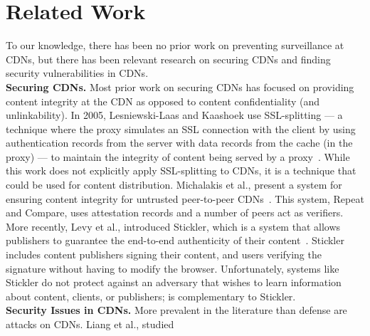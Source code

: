 \section{Related Work}
\label{sec:related}

To our knowledge, there has been no prior work on preventing surveillance at CDNs, but there 
has been relevant research on securing CDNs and finding security vulnerabilities in CDNs.\\
\vspace{0pt}
\textbf{Securing CDNs.} Most prior work on securing CDNs has focused on providing content 
integrity at the CDN as opposed to content confidentiality (and unlinkability).  In 2005, 
Lesniewski-Laas and Kaashoek use SSL-splitting --- a technique 
where the proxy simulates an SSL connection with the client by using authentication records from 
the server with data records from the cache (in the proxy) --- to maintain the 
integrity of content being served by a proxy~\cite{lesniewski2005ssl}.  While this work does not 
explicitly apply SSL-splitting to CDNs, it is a technique that could be used for content 
distribution.  Michalakis et al., present a system for ensuring content integrity for untrusted 
peer-to-peer CDNs~\cite{michalakis2007ensuring}.  This system, Repeat and 
Compare, uses attestation records and a number of peers act as verifiers.  More recently, Levy et al., 
introduced Stickler, which is a system that allows publishers to guarantee the end-to-end 
authenticity of their content~\cite{levy2015stickler}.  Stickler includes content publishers 
signing their content, and users verifying the signature without having to modify the browser.  Unfortunately, 
systems like Stickler do not protect against an adversary that wishes to learn information about content, clients, 
or publishers; \system{} is complementary to Stickler.\\
\vspace{0pt}
\textbf{Security Issues in CDNs.} More prevalent in the literature than defense are attacks on CDNs.  Liang et al., studied 
